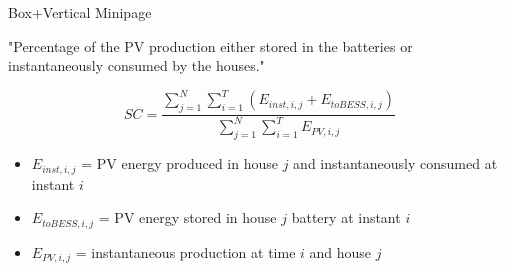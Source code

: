 \documentclass[xcolor=dvipsnames,aspectratio=169]{beamer} %
\begin{document}
\begin{frame}[noframenumbering]{Box+Vertical Minipage}

\begin{minipage}[t]{0.9\paperwidth}

\vspace{-60pt}
\begin{block}{}
"Percentage of the PV production either stored in the batteries or instantaneously consumed by the houses."
\end{block}

\end{minipage}
\begin{minipage}[b]{0.9\paperwidth}

    \begin{equation*}
    SC= \frac{\sum_{j=1}^N \sum_{i=1}^{T} (E_{inst,i,j}+E_{toBESS,i,j})}{\sum_{j=1}^N \sum_{i=1}^{T} E_{PV,i,j}}
    \end{equation*}
    \begin{itemize}
    \item $E_{inst,i,j}$ = PV energy produced in house $j$ and instantaneously consumed at instant $i$
    \item $E_{toBESS,i,j}$ = PV energy stored in house $j$ battery at instant $i$
    \item $E_{PV,i,j}$ = instantaneous production at time $i$ and house $j$
    \end{itemize}

\end{minipage}

\end{frame}
\end{document}
